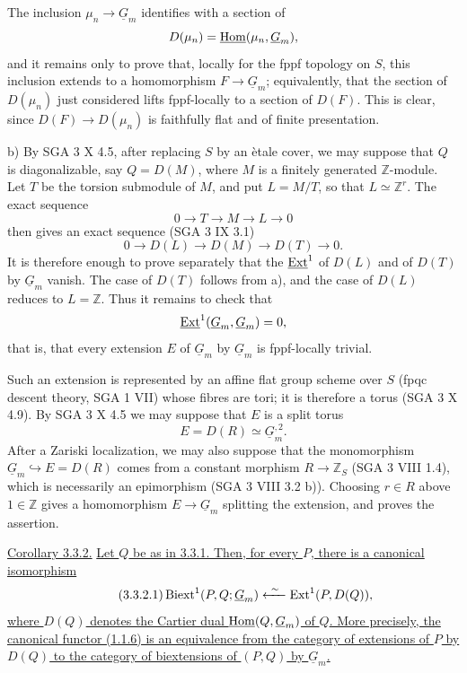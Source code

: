 The inclusion $\mu_n\longrightarrow\underline G_m$ identifies with a
section of
\[
 D(\mu_n)=\uHom(\mu_n,\underline G_m),
\]
and it remains only to prove that, locally for the fppf topology on
$S$, this inclusion extends to a homomorphism
$F\longrightarrow\underline G_m$; equivalently, that the section of
$D(\mu_n)$ just considered lifts fppf-locally to a section of $D(F)$.
This is clear, since $D(F)\longrightarrow D(\mu_n)$ is faithfully flat
and of finite presentation.

\medskip
\noindent b) By SGA 3 X 4.5, after replacing $S$ by an \`etale cover,
we may suppose that $Q$ is diagonalizable, say $Q=D(M)$, where $M$ is
a finitely generated $\mathbb Z$-module.  Let $T$ be the torsion
submodule of $M$, and put $L=M/T$, so that $L\simeq\mathbb Z^r$.  The
exact sequence
\[
 0\longrightarrow T\longrightarrow M\longrightarrow L
 \longrightarrow0
\]
then gives an exact sequence (SGA 3 IX 3.1)
\[
 0\longrightarrow D(L)\longrightarrow D(M)\longrightarrow D(T)
 \longrightarrow0.
\]
It is therefore enough to prove separately that the $\uExt^1$ of
$D(L)$ and of $D(T)$ by $\underline G_m$ vanish.  The case of $D(T)$
follows from a), and the case of $D(L)$ reduces to $L=\mathbb Z$.
Thus it remains to check that
\[
 \uExt^1(\underline G_m,\underline G_m)=0,
\]
that is, that every extension $E$ of $\underline G_m$ by
$\underline G_m$ is fppf-locally trivial.

Such an extension is represented by an affine flat group scheme over
$S$ (fpqc descent theory, SGA 1 VII) whose fibres are tori; it is
therefore a torus (SGA 3 X 4.9).  By SGA 3 X 4.5 we may suppose that
$E$ is a split torus
\[
 E=D(R)\simeq\underline G_m^{,2}.
\]
After a Zariski localization, we may also suppose that the
monomorphism $\underline G_m\hookrightarrow E=D(R)$ comes from a
constant morphism $R\longrightarrow\mathbb Z_S$ (SGA 3 VIII 1.4),
which is necessarily an epimorphism (SGA 3 VIII 3.2 b)).  Choosing
$r\in R$ above $1\in\mathbb Z$ gives a homomorphism
$E\longrightarrow\underline G_m$ splitting the extension, and proves
the assertion.

\medskip
\noindent\underline{Corollary 3.3.2.}  \underline{Let $Q$ be as in
3.3.1.  Then, for every $P$, there is a canonical isomorphism}
\begin{equation}\tag{3.3.2.1}
 \Biext^1(P,Q;\underline G_m)
 \xleftarrow{\ \sim\ }\Ext^1(P,D(Q)),
\end{equation}
\underline{where $D(Q)$ denotes the Cartier dual
$\uHom(Q,\underline G_m)$ of $Q$.  More precisely, the canonical
functor (1.1.6) is an equivalence from the category of extensions of
$P$ by $D(Q)$ to the category of biextensions of $(P,Q)$ by
$\underline G_m$.}

